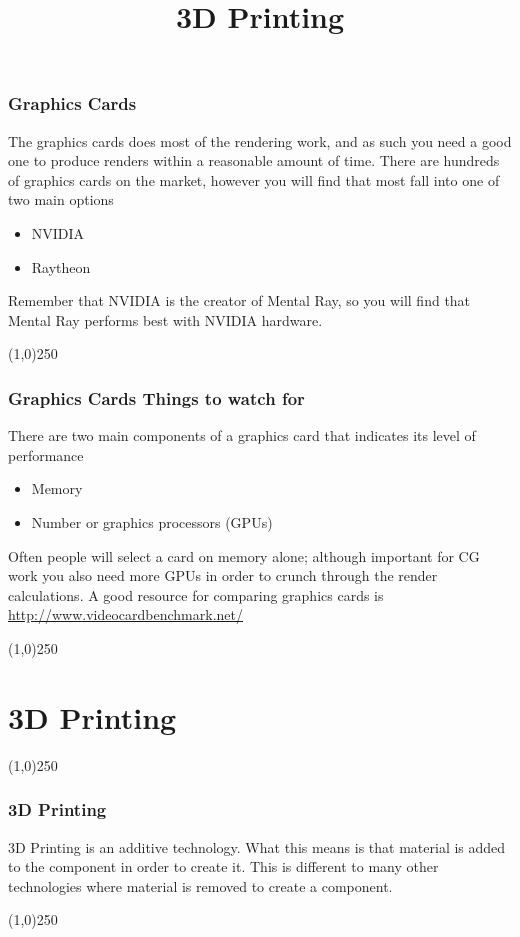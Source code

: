 \begin{frame}
\frametitle{Graphics Cards}
The graphics cards does most of the rendering work, and as such you need a good one to produce renders within a reasonable amount of time.  There are hundreds of graphics cards on the market, however you will find that most fall into one of two main options
\begin{itemize}
	\item NVIDIA
	\item Raytheon
\end{itemize}
Remember that NVIDIA is the creator of Mental Ray, so you will find that Mental Ray performs best with NVIDIA hardware.
\end{frame}
\begin{center}\line(1,0){250}\end{center}


\begin{frame}
\frametitle{Graphics Cards \hfill\hfill Things to watch for}
There are two main components of a graphics card that indicates its level of performance
\begin{itemize}
	\item Memory
	\item Number or graphics processors (GPUs)
\end{itemize}
Often people will select a card on memory alone; although important for CG work you also need more GPUs in order to crunch through the render calculations.  A good resource for comparing graphics cards is \href{http://www.videocardbenchmark.net/}{http://www.videocardbenchmark.net/}
\end{frame}
\begin{center}\line(1,0){250}\end{center}



\section{3D Printing}
\begin{frame}

\title[3D Printing]{3D Printing}
\titlepage
\end{frame}\begin{center}\line(1,0){250}\end{center}

\begin{frame}
\frametitle{3D Printing}
3D Printing is an additive technology.  What this means is that material is added to the component in order to create it.  This is different to many other technologies where material is removed to create a component.

\end{frame}
\begin{center}\line(1,0){250}\end{center}


